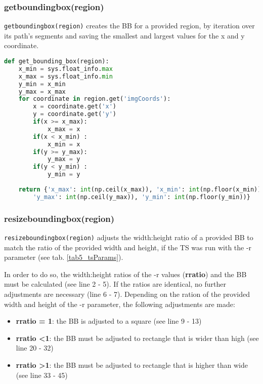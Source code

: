 \subsubsection{get{\textunderscore}bounding{\textunderscore}box(region)}
\texttt{get{\textunderscore}bounding{\textunderscore}box(region)} creates the BB for a provided region, by iteration over its path's segments and saving the smallest and largest values for the x and y coordinate.

\begin{lstlisting}[frame=single,language=python]
def get_bounding_box(region):
	x_min = sys.float_info.max
	x_max = sys.float_info.min
	y_min = x_min
	y_max = x_max
	for coordinate in region.get('imgCoords'):
		x = coordinate.get('x')
		y = coordinate.get('y')
		if(x >= x_max):
			x_max = x
		if(x < x_min) :
			x_min = x
		if(y >= y_max):
			y_max = y
		if(y < y_min) :
			y_min = y
	
	return {'x_max': int(np.ceil(x_max)), 'x_min': int(np.floor(x_min)),
		'y_max': int(np.ceil(y_max)), 'y_min': int(np.floor(y_min))}
\end{lstlisting}


\subsubsection{resize{\textunderscore}bounding{\textunderscore}box(region)}
\texttt{resize{\textunderscore}bounding{\textunderscore}box(region)} adjusts the width:height ratio of a provided BB to match the ratio of the provided width and height, if the TS was run with the -r parameter (see tab. \ref{tab5_tsParams}).

In order to do so, the width:height ratios of the -r values (\textbf{r{\textunderscore}ratio}) and the BB must be calculated (see line 2 - 5). If the ratios are identical, no further adjustments are necessary (line 6 - 7). Depending on the ration of the provided width and height of the -r parameter, the following adjustments are made:
\begin{itemize}
	\item \textbf{r{\textunderscore}ratio = 1}: the BB is adjusted to a square (see line 9 - 13)
	\item \textbf{r{\textunderscore}ratio \textless 1}: the BB must be adjusted to rectangle that is wider than high (see line 20 - 32)
	\item \textbf{r{\textunderscore}ratio \textgreater 1}: the BB must be adjusted to rectangle that is higher than wide (see line 33 - 45)
\end{itemize}

